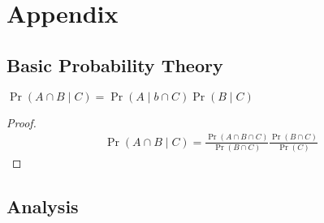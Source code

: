 \chapter{Appendix}
\section{Basic Probability Theory}
\begin{lemma}\label{appx1}
    \(\Pr(A\cap B \mid C) = \Pr(A\mid b\cap C)\Pr(B\mid C)\)
\end{lemma}
\begin{proof}
    \begin{align*}
        \Pr(A\cap B \mid C)=\frac{\Pr(A\cap B\cap C)}{\Pr(B\cap C)}\frac{\Pr(B\cap C)}{\Pr(C)}
    \end{align*}
\end{proof}
\section{Analysis}
\endinput
